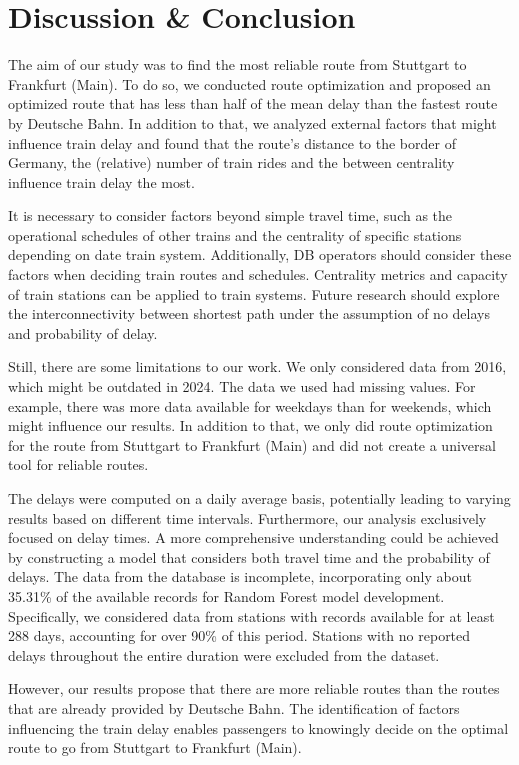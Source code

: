 \documentclass{article}
\theoremstyle{plain}
\theoremstyle{definition}
\theoremstyle{remark}
\begin{document}
\section{Discussion \& Conclusion}\label{sec:conclusion}

The aim of our study was to find the most reliable route from Stuttgart to Frankfurt (Main). To do so, we conducted route optimization and proposed an optimized route that has less than half of the mean delay than the fastest route by Deutsche Bahn. In addition to that, we analyzed external factors that might influence train delay and found that the route's distance to the border of Germany, the (relative) number of train rides and the between centrality influence train delay the most.

It is necessary to consider factors beyond simple travel time, such as the operational schedules of other trains and the centrality of specific stations depending on date train system. Additionally, DB operators should consider these factors when deciding train routes and schedules. Centrality metrics and capacity of train stations can be applied to train systems. Future research should explore the interconnectivity between shortest path under the assumption of no delays and probability of delay.

Still, there are some limitations to our work. We only considered data from 2016, which might be outdated in 2024. The data we used had missing values. For example, there was more data available for weekdays than for weekends, which might influence our results. In addition to that, we only did route optimization for the route from Stuttgart to Frankfurt (Main) and did not create a universal tool for reliable routes.

The delays were computed on a daily average basis, potentially leading to varying results based on different time intervals. Furthermore, our analysis exclusively focused on delay times. A more comprehensive understanding could be achieved by constructing a model that considers both travel time and the probability of delays. The data from the database is incomplete, incorporating only about 35.31\% of the available records for Random Forest model development. Specifically, we considered data from stations with records available for at least 288 days, accounting for over 90\% of this period. Stations with no reported delays throughout the entire duration were excluded from the dataset.

However, our results propose that there are more reliable routes than the routes that are already provided by Deutsche Bahn. The identification of factors influencing the train delay enables passengers to knowingly decide on the optimal route to go from Stuttgart to Frankfurt (Main).
\end{document}

